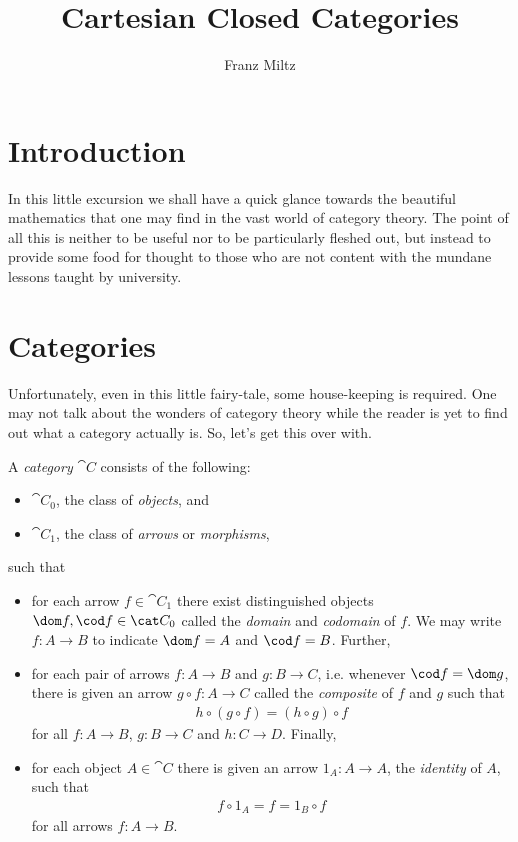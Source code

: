 \documentclass{article}
\begin{document}
\mkawodeythms
\title{Cartesian Closed Categories}
\author{Franz Miltz}
\maketitle
\section{Introduction}

In this little excursion we shall have a quick glance towards the beautiful mathematics that 
one may find in the vast world of category theory. The point of all this is neither to be useful 
nor to be particularly fleshed out, but instead to provide some food for thought to those who 
are not content with the mundane lessons taught by university.

\section{Categories}

Unfortunately, even in this little fairy-tale, some house-keeping is required. One may not talk 
about the wonders of category theory while the reader is yet to find out what a category actually is.
So, let's get this over with. 

\begin{definition}[Category]
    A \emph{category} $\cat C$ consists of the following:
    \begin{itemize}
        \item $\cat C_0$, the class of \emph{objects}, and
        \item $\cat C_1$, the class of \emph{arrows} or \emph{morphisms},
    \end{itemize} 
    such that 
    \begin{itemize}
        \item for each arrow $f\in\cat C_1$ there exist distinguished objects $\dom f,\cod f\in\cat C_0$
            called the \emph{domain} and \emph{codomain} of $f$. We may write $f:A\to B$ to indicate
            $\dom f=A$ and $\cod f=B$. Further,
        \item for each pair of arrows $f:A\to B$ and $g:B\to C$, i.e. whenever $\cod f = \dom g$, there 
            is given an arrow $g\circ f: A\to C$ called the \emph{composite} of $f$ and $g$ such that 
            \begin{align*}
                h \circ (g\circ f) = (h\circ g)\circ f
            \end{align*}
            for all $f:A\to B$, $g:B\to C$ and $h:C\to D$. Finally,
        \item for each object $A\in\cat C$ there is given an arrow $1_A:A\to A$, the \emph{identity} of $A$,
            such that 
            \begin{align*}
                f \circ 1_A = f = 1_B\circ f
            \end{align*}
            for all arrows $f:A\to B$.
    \end{itemize}
\end{definition}
\end{document}
